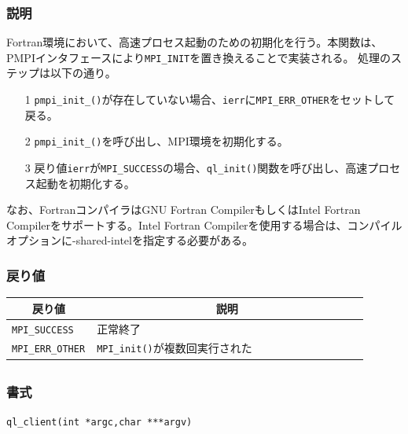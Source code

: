\documentclass[twoside,11pt,fleqn]{book}
\begin{document}
\subsubsection*{説明}
Fortran環境において、高速プロセス起動のための初期化を行う。本関数は、PMPIインタフェースにより\texttt{MPI\_INIT}を置き換えることで実装される。
%
処理のステップは以下の通り。
\begin{itemize}
\item[1]\texttt{pmpi\_init\_()}が存在していない場合、\texttt{ierr}に\texttt{MPI\_ERR\_OTHER}をセットして戻る。
\item[2]\texttt{pmpi\_init\_()}を呼び出し、MPI環境を初期化する。
\item[3]戻り値\texttt{ierr}が\texttt{MPI\_SUCCESS}の場合、\texttt{ql\_init()}関数を呼び出し、高速プロセス起動を初期化する。
\end{itemize}

なお、FortranコンパイラはGNU Fortran CompilerもしくはIntel Fortran Compilerをサポートする。Intel Fortran Compilerを使用する場合は、コンパイルオプションに-shared-intelを指定する必要がある。

\subsubsection*{戻り値}{\quad}
\begin{table}[!ht]
\footnotesize
\begin{tabular}{|p{0.15\linewidth}|p{0.75\linewidth}|} \hline
\multicolumn{1}{|c}{\textbf{戻り値}}&\multicolumn{1}{|c|}{\textbf{説明}}\\ \hline \hline
\texttt{MPI\_SUCCESS}&正常終了\\ \hline
\texttt{MPI\_ERR\_OTHER}&\texttt{MPI\_init()}が複数回実行された\\ \hline
\end{tabular}
\vspace{-0em}
\end{table}
\FloatBarrier

\subsection{}
\subsubsection*{書式}{\quad} \texttt{ql\_client(int *argc,char ***argv)}
\end{document}
